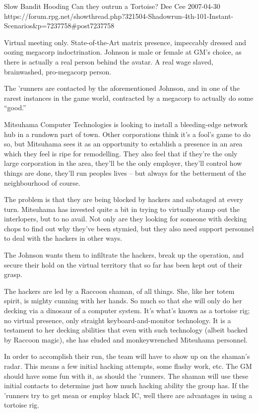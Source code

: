 \begin{scenario}{Slow Bandit}
	{Hooding}
	{Can they outrun a Tortoise?}
	{Dee Cee}
	{2007-04-30}
	{https://forum.rpg.net/showthread.php?321504-Shadowrun-4th-101-Instant-Scenarios\&p=7237758\#post7237758}

  Virtual meeting only. State-of-the-Art matrix presence, impeccably dressed and oozing megacorp indoctrination. Johnson is male or female at GM's choice, as there is actually a real person behind the avatar. A real wage slaved, brainwashed, pro-megacorp person.

\synopsis  The 'runners are contacted by the aforementioned Johnson, and in one of the rarest instances in the game world, contracted by a megacorp to actually do some ``good.''

Mitsuhama Computer Technologies is looking to install a bleeding-edge network hub in a rundown part of town. Other corporations think it's a fool's game to do so, but Mitsuhama sees it as an opportunity to establish a presence in an area which they feel is ripe for remodelling. They also feel that if they're the only large corporation in the area, they'll be the only employer, they'll control how things are done, they'll run peoples lives – but always for the betterment of the neighbourhood of course.

The problem is that they are being blocked by hackers and sabotaged at every turn. Mitsuhama has invested quite a bit in trying to virtually stamp out the interlopers, but to no avail. Not only are they looking for someone with decking chops to find out why they've been stymied, but they also need support personnel to deal with the hackers in other ways.

The Johnson wants them to infiltrate the hackers, break up the operation, and secure their hold on the virtual territory that so far has been kept out of their grasp.

\notes  The hackers are led by a Raccoon shaman, of all things. She, like her totem spirit, is mighty cunning with her hands. So much so that she will only do her decking via a dinosaur of a computer system. It's what's known as a tortoise rig; no virtual presence, only straight keyboard-and-monitor technology. It is a testament to her decking abilities that even with such technology (albeit backed by Raccoon magic), she has eluded and monkeywrenched Mitsuhama personnel.

In order to accomplish their run, the team will have to show up on the shaman's radar. This means a few initial hacking attempts, some flashy work, etc. The GM should have some fun with it, as should the 'runners. The shaman will use these initial contacts to determine just how much hacking ability the group has. If the 'runners try to get mean or employ black IC, well there are advantages in using a tortoise rig.


\end{scenario}
